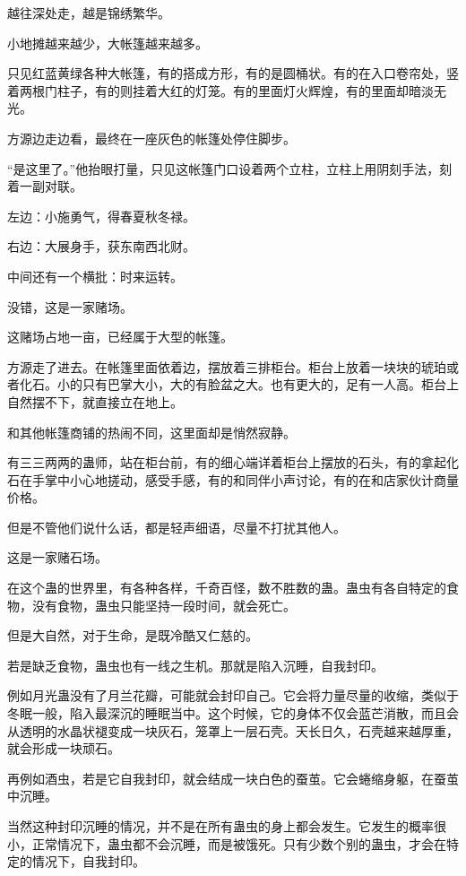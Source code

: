 
\begin{this_body}

越往深处走，越是锦绣繁华。

小地摊越来越少，大帐篷越来越多。

只见红蓝黄绿各种大帐篷，有的搭成方形，有的是圆桶状。有的在入口卷帘处，竖着两根门柱子，有的则挂着大红的灯笼。有的里面灯火辉煌，有的里面却暗淡无光。

方源边走边看，最终在一座灰色的帐篷处停住脚步。

“是这里了。”他抬眼打量，只见这帐篷门口设着两个立柱，立柱上用阴刻手法，刻着一副对联。

左边：小施勇气，得春夏秋冬禄。

右边：大展身手，获东南西北财。

中间还有一个横批：时来运转。

没错，这是一家赌场。

这赌场占地一亩，已经属于大型的帐篷。

方源走了进去。在帐篷里面依着边，摆放着三排柜台。柜台上放着一块块的琥珀或者化石。小的只有巴掌大小，大的有脸盆之大。也有更大的，足有一人高。柜台上自然摆不下，就直接立在地上。

和其他帐篷商铺的热闹不同，这里面却是悄然寂静。

有三三两两的蛊师，站在柜台前，有的细心端详着柜台上摆放的石头，有的拿起化石在手掌中小心地搓动，感受手感，有的和同伴小声讨论，有的在和店家伙计商量价格。

但是不管他们说什么话，都是轻声细语，尽量不打扰其他人。

这是一家赌石场。

在这个蛊的世界里，有各种各样，千奇百怪，数不胜数的蛊。蛊虫有各自特定的食物，没有食物，蛊虫只能坚持一段时间，就会死亡。

但是大自然，对于生命，是既冷酷又仁慈的。

若是缺乏食物，蛊虫也有一线之生机。那就是陷入沉睡，自我封印。

例如月光蛊没有了月兰花瓣，可能就会封印自己。它会将力量尽量的收缩，类似于冬眠一般，陷入最深沉的睡眠当中。这个时候，它的身体不仅会蓝芒消散，而且会从透明的水晶状褪变成一块灰石，笼罩上一层石壳。天长日久，石壳越来越厚重，就会形成一块顽石。

再例如酒虫，若是它自我封印，就会结成一块白色的蚕茧。它会蜷缩身躯，在蚕茧中沉睡。

当然这种封印沉睡的情况，并不是在所有蛊虫的身上都会发生。它发生的概率很小，正常情况下，蛊虫都不会沉睡，而是被饿死。只有少数个别的蛊虫，才会在特定的情况下，自我封印。


\end{this_body}
